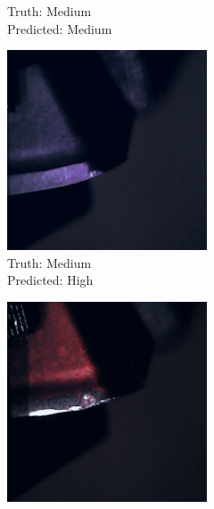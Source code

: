 \begin{figure}[hbtp]
\begin{subfigure}{.24\textwidth}
			\caption{Truth: Medium \\Predicted: Medium}
		\end{subfigure}
		\hspace*{\fill}
		\begin{subfigure}{.24\textwidth}
			\centering
			\includegraphics[width=\linewidth]{fig/results/wandb/spaghetti_dataset/images/media_images_Examples_144_p0_t2.png}
			\caption{Truth: Medium \\Predicted: High}
			\label{fig:res:sd:testimg:error}
		\end{subfigure}
		\hspace*{\fill}
		\begin{subfigure}{.24\textwidth}
			\centering
			\includegraphics[width=\linewidth]{fig/results/wandb/spaghetti_dataset/images/media_images_Examples_102_p0_t0.png}

\end{subfigure}
\end{figure}
